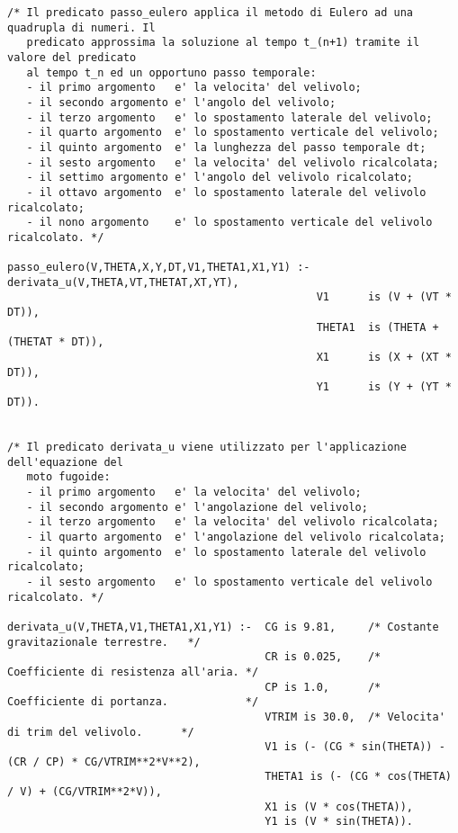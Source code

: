 \begin{verbatim}
/* Il predicato passo_eulero applica il metodo di Eulero ad una quadrupla di numeri. Il
   predicato approssima la soluzione al tempo t_(n+1) tramite il valore del predicato 
   al tempo t_n ed un opportuno passo temporale: 
   - il primo argomento   e' la velocita' del velivolo; 
   - il secondo argomento e' l'angolo del velivolo;
   - il terzo argomento   e' lo spostamento laterale del velivolo;
   - il quarto argomento  e' lo spostamento verticale del velivolo;
   - il quinto argomento  e' la lunghezza del passo temporale dt;
   - il sesto argomento   e' la velocita' del velivolo ricalcolata; 
   - il settimo argomento e' l'angolo del velivolo ricalcolato;
   - il ottavo argomento  e' lo spostamento laterale del velivolo ricalcolato;
   - il nono argomento    e' lo spostamento verticale del velivolo ricalcolato. */

passo_eulero(V,THETA,X,Y,DT,V1,THETA1,X1,Y1) :- derivata_u(V,THETA,VT,THETAT,XT,YT),
                                                V1      is (V + (VT * DT)),
                                                THETA1  is (THETA + (THETAT * DT)),
                                                X1      is (X + (XT * DT)),
                                                Y1      is (Y + (YT * DT)). 


/* Il predicato derivata_u viene utilizzato per l'applicazione dell'equazione del 
   moto fugoide:
   - il primo argomento   e' la velocita' del velivolo;
   - il secondo argomento e' l'angolazione del velivolo;
   - il terzo argomento   e' la velocita' del velivolo ricalcolata;
   - il quarto argomento  e' l'angolazione del velivolo ricalcolata;
   - il quinto argomento  e' lo spostamento laterale del velivolo ricalcolato;
   - il sesto argomento   e' lo spostamento verticale del velivolo ricalcolato. */

derivata_u(V,THETA,V1,THETA1,X1,Y1) :-  CG is 9.81,     /* Costante gravitazionale terrestre.   */
                                        CR is 0.025,    /* Coefficiente di resistenza all'aria. */
                                        CP is 1.0,      /* Coefficiente di portanza.            */
                                        VTRIM is 30.0,  /* Velocita' di trim del velivolo.      */
                                        V1 is (- (CG * sin(THETA)) - (CR / CP) * CG/VTRIM**2*V**2),
                                        THETA1 is (- (CG * cos(THETA) / V) + (CG/VTRIM**2*V)),
                                        X1 is (V * cos(THETA)),
                                        Y1 is (V * sin(THETA)).



\end{verbatim}
